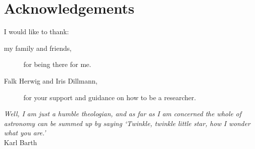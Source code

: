 \newpage
{}

\section*{\large Acknowledgements}
\noindent I would like to thank:
\begin{description}
\item[my family and friends,]
	for being there for me.
\item[Falk Herwig and Iris Dillmann,]
	for your support and guidance on how to be a researcher.
\end{description}

\begin{flushright}
\textit{Well, I am just a humble theologian, and as far as I am concerned the whole of astronomy can be summed up by saying ‘Twinkle, twinkle little star, how I wonder what you are.’}\\
Karl Barth
\\
\end{flushright}

